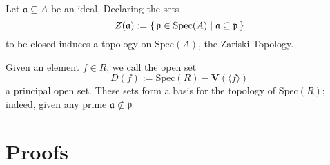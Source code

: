 \begin{defn}
    Let \(\mathfrak{a} \subseteq A\) be an ideal. Declaring the sets
    \begin{equation}
        Z(\mathfrak{a}) := \left\{\, \mathfrak{p} \in \mathrm{Spec}(A) \mathrel{\mid} \mathfrak{a} \subseteq \mathfrak{p} \,\right\}
    \end{equation}
    to be closed induces a topology on \(\mathrm{Spec}(A)\), the Zariski Topology.

    Given an element \(f \in R\), we call the open set
    \begin{equation}
        D(f) := \mathrm{Spec}(R) - \mathbf{V}(\langle f \rangle)
    \end{equation}
    a principal open set. These sets form a basis for the topology of \(\mathrm{Spec}(R)\); indeed, given any prime \(\mathfrak{a} \not\subset \mathfrak{p}\)
\end{defn}

\section{Proofs}

